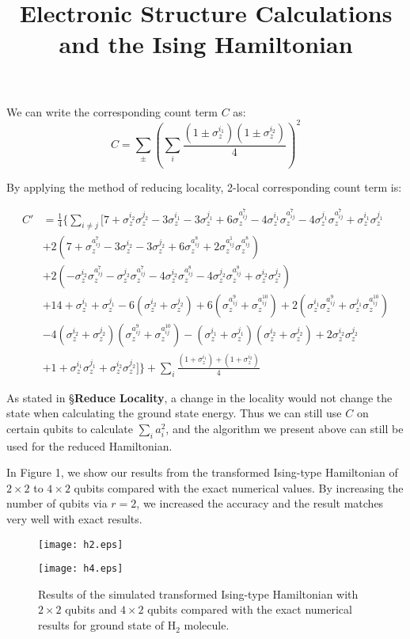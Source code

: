 \documentclass{article}
\newcommand\z[1]{\sigma_z^{#1}}\title{Electronic Structure Calculations and the Ising Hamiltonian}
\begin{document}
We can write the corresponding count term $C$ as:
\begin{equation}
C=\sum_{\pm}(\sum_i\frac{(1\pm\z{i_1})(1\pm \z{i_2})}{4})^2
\end{equation}

By applying the method of reducing locality, 2-local corresponding count term is:

\begin{equation}
\begin{aligned}
C'&=\frac{1}{4}\{\sum_{i \neq j}[7+\z{i_2}\z{j_2}-3\z{i_1}-3\z{j_1}+6\z{a_{ij}^7}-4\z{i_1}\z{a_{ij}^7}-4\z{j_1}\z{a_{ij}^7}+\z{i_1}\z{j_1}\\
&+2(7+\z{a_{ij}^7}-3\z{i_2}-3\z{j_2}+6\z{a_{ij}^8}+2\z{a_{ij}^1}\z{a_{ij}^8})\\
&+2(-\z{i_2}\z{a_{ij}^7}-\z{j_2}\z{a_{ij}^7}-4\z{i_2}\z{a_{ij}^8}-4\z{j_2}\z{a_{ij}^8}+\z{i_2}\z{j_2})\\
&+14+\z{i_1}+\z{j_1}-6(\z{i_2}+\z{j_2})+6(\z{a_{ij}^9}+\z{a_{ij}^10})+2(\z{i_1}\z{a_{ij}^9}+\z{j_1}\z{a_{ij}^10})\\
&-4(\z{i_2}+\z{j_2})(\z{a_{ij}^9}+\z{a_{ij}^10})-(\z{i_1}+\z{j_1})(\z{i_2}+\z{j_2})+2\z{i_2}\z{j_2}\\
&+1+\z{i_1}\z{j_1}+\z{i_2}\z{j_2}]\}+\sum_{i}\frac{(1+\z{i_1})+(1+\z{i_2})}{4}
\end{aligned}
\end{equation}

As stated in \S {\bf Reduce Locality}, a change in the locality would not change the state when calculating the ground state energy. Thus we can still use $C$ on certain qubits to calculate $\sum_ia_i^2$, and the algorithm we present above can still be used for the reduced Hamiltonian.

In Figure 1, we show our results from the transformed Ising-type Hamiltonian of $2\times2$ to $4\times2$ qubits compared with the exact numerical values. By increasing the number of qubits via $r=2$, we increased the accuracy and the result matches very well with exact results.

\begin{figure}[H]
\begin{minipage}[t]{0.5\linewidth}
\centering
\texttt{[image: h2.eps]}
\label{fig:side:a}
\end{minipage}%
\begin{minipage}[t]{0.5\linewidth}
\centering
\texttt{[image: h4.eps]}
\label{fig:side:b}
\end{minipage}



\caption{Results of  the simulated transformed Ising-type Hamiltonian with $2\times 2$ qubits and $4 \times 2$ qubits compared with the exact numerical results for ground state of H$_2$ molecule.}
\end{figure}
\end{document}
